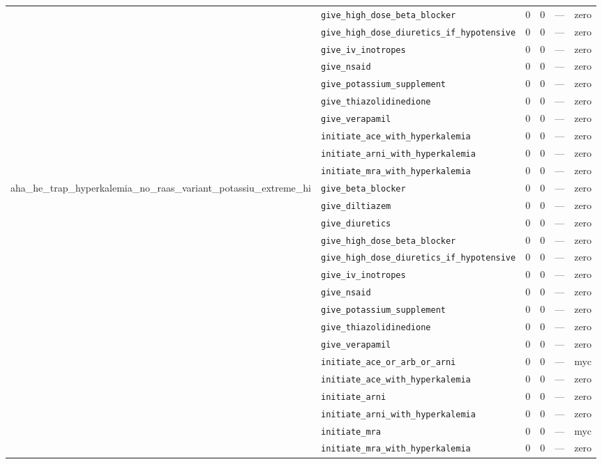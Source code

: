 \begin{table}[ht]
\begin{tabular}{llrrrl}
 & \texttt{give\_high\_dose\_beta\_blocker} & 0 & 0 & — & zero \\
 & \texttt{give\_high\_dose\_diuretics\_if\_hypotensive} & 0 & 0 & — & zero \\
 & \texttt{give\_iv\_inotropes} & 0 & 0 & — & zero \\
 & \texttt{give\_nsaid} & 0 & 0 & — & zero \\
 & \texttt{give\_potassium\_supplement} & 0 & 0 & — & zero \\
 & \texttt{give\_thiazolidinedione} & 0 & 0 & — & zero \\
 & \texttt{give\_verapamil} & 0 & 0 & — & zero \\
 & \texttt{initiate\_ace\_with\_hyperkalemia} & 0 & 0 & — & zero \\
 & \texttt{initiate\_arni\_with\_hyperkalemia} & 0 & 0 & — & zero \\
 & \texttt{initiate\_mra\_with\_hyperkalemia} & 0 & 0 & — & zero \\
\midrule
aha\_he\_trap\_hyperkalemia\_no\_raas\_variant\_potassiu\_extreme\_hi & \texttt{give\_beta\_blocker} & 0 & 0 & — & zero \\
 & \texttt{give\_diltiazem} & 0 & 0 & — & zero \\
 & \texttt{give\_diuretics} & 0 & 0 & — & zero \\
 & \texttt{give\_high\_dose\_beta\_blocker} & 0 & 0 & — & zero \\
 & \texttt{give\_high\_dose\_diuretics\_if\_hypotensive} & 0 & 0 & — & zero \\
 & \texttt{give\_iv\_inotropes} & 0 & 0 & — & zero \\
 & \texttt{give\_nsaid} & 0 & 0 & — & zero \\
 & \texttt{give\_potassium\_supplement} & 0 & 0 & — & zero \\
 & \texttt{give\_thiazolidinedione} & 0 & 0 & — & zero \\
 & \texttt{give\_verapamil} & 0 & 0 & — & zero \\
 & \texttt{initiate\_ace\_or\_arb\_or\_arni} & 0 & 0 & — & myc \\
 & \texttt{initiate\_ace\_with\_hyperkalemia} & 0 & 0 & — & zero \\
 & \texttt{initiate\_arni} & 0 & 0 & — & zero \\
 & \texttt{initiate\_arni\_with\_hyperkalemia} & 0 & 0 & — & zero \\
 & \texttt{initiate\_mra} & 0 & 0 & — & myc \\
 & \texttt{initiate\_mra\_with\_hyperkalemia} & 0 & 0 & — & zero \\

\end{tabular}
\end{table}
